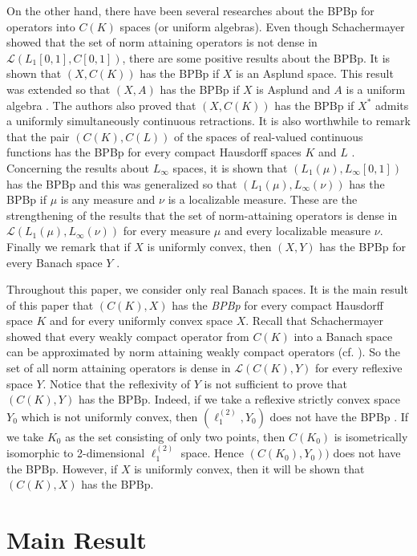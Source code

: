 \documentclass[a4paper]{amsart}
\theoremstyle{plain}
\theoremstyle{definition}
\begin{document}
On the other hand, there have been several researches about the BPBp for operators into $C(K)$ spaces (or uniform algebras).
Even though Schachermayer showed \cite{S} that the set of norm attaining operators is not dense in $\mathcal{L}(L_1[0,1], C[0,1])$,  there are some positive results about the BPBp. It is shown \cite{ACK} that $(X, C(K))$ has the BPBp if $X$ is an Asplund space.  This result was extended so that $(X, A)$ has the BPBp if $X$ is Asplund and $A$ is a uniform algebra \cite{CasGuiKad}. The authors also proved \cite{KL} that $(X, C(K))$ has the BPBp if $X^*$ admits a uniformly simultaneously continuous retractions. It is also worthwhile to remark that the pair $(C(K), C(L))$ of the spaces of real-valued continuous functions has the BPBp for every compact Hausdorff spaces $K$ and $L$ \cite{ABCCKLLM}. Concerning the results about $L_\infty$ spaces, it is shown \cite{ACGM} that $(L_1(\mu), L_\infty[0,1])$ has the BPBp and this was generalized \cite{CKLM} so that $(L_1(\mu), L_\infty(\nu))$ has  the BPBp if $\mu$ is any measure and $\nu$ is a localizable measure. These are the strengthening of the results that the set of norm-attaining operators is dense in $\mathcal{L}(L_1(\mu), L_\infty(\nu))$  \cite{FP, PS} for every measure $\mu$ and every localizable measure $\nu$. Finally we remark that if $X$ is uniformly convex, then $(X, Y)$ has the BPBp for every Banach space $Y$ \cite{ABGM, ACKLM, KL2}.

Throughout this paper, we consider only real Banach spaces. It is the main result of this paper that  $(C(K), X)$ has the \emph{BPBp} for every compact Hausdorff space $K$ and for every uniformly convex space $X$. Recall that Schachermayer showed  \cite{S} that every weakly compact operator from $C(K)$ into a Banach space can be approximated by norm attaining weakly compact operators (cf. \cite[Theorem 2]{ACKP}). So the set of all norm attaining operators is dense in $\mathcal{L}(C(K),Y)$ for every reflexive space $Y$.  Notice that the reflexivity of $Y$ is not sufficient to prove that $(C(K), Y)$ has the BPBp. Indeed, if we take a reflexive strictly convex space $Y_0$ which is not uniformly convex, then $(\ell_1^{(2)}, Y_0)$ does not have the BPBp \cite{AAGM2, ACKLM}. If we take $K_0$ as the set consisting of only two points, then $C(K_0)$ is isometrically isomorphic to 2-dimensional $\ell_1^{(2)}$ space. Hence $(C(K_0), Y_0))$ does not have the BPBp. However, if $X$ is uniformly convex, then it will be shown that $(C(K), X)$ has the BPBp.

 \section{Main Result}
\end{document}
